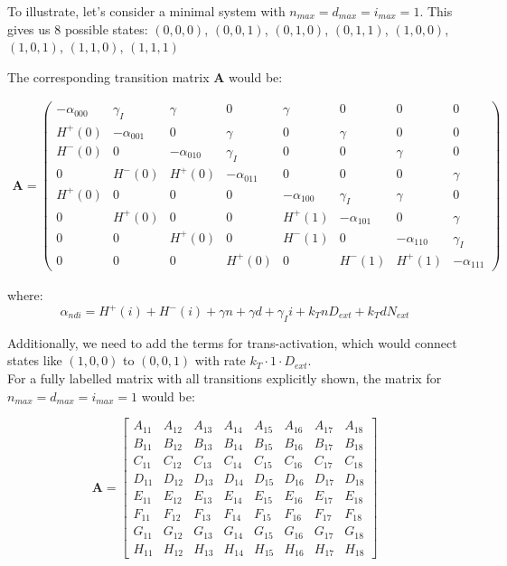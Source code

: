 \documentclass{article}
\begin{document}
\begin{flushleft}
To illustrate, let's consider a minimal system with $n_{max} = d_{max} = i_{max} = 1$. This gives us 8 possible states:
$(0,0,0)$, $(0,0,1)$, $(0,1,0)$, $(0,1,1)$, $(1,0,0)$, $(1,0,1)$, $(1,1,0)$, $(1,1,1)$

The corresponding transition matrix $\mathbf{A}$ would be:

\begin{align*}
\mathbf{A} = 
\begin{pmatrix}
-\alpha_{000} & \gamma_I & \gamma & 0 & \gamma & 0 & 0 & 0 \\
H^+(0) & -\alpha_{001} & 0 & \gamma & 0 & \gamma & 0 & 0 \\
H^-(0) & 0 & -\alpha_{010} & \gamma_I & 0 & 0 & \gamma & 0 \\
0 & H^-(0) & H^+(0) & -\alpha_{011} & 0 & 0 & 0 & \gamma \\
H^+(0) & 0 & 0 & 0 & -\alpha_{100} & \gamma_I & \gamma & 0 \\
0 & H^+(0) & 0 & 0 & H^+(1) & -\alpha_{101} & 0 & \gamma \\
0 & 0 & H^+(0) & 0 & H^-(1) & 0 & -\alpha_{110} & \gamma_I \\
0 & 0 & 0 & H^+(0) & 0 & H^-(1) & H^+(1) & -\alpha_{111}
\end{pmatrix}
\end{align*}

where:
\[
\alpha_{ndi} = H^+(i) + H^-(i) + \gamma n + \gamma d + \gamma_I i + k_T n D_{ext} + k_T d N_{ext}
\]

Additionally, we need to add the terms for trans-activation, which would connect states like $(1,0,0)$ to $(0,0,1)$ with rate $k_T \cdot 1 \cdot D_{ext}$.\\

For a fully labelled matrix with all transitions explicitly shown, the matrix for $n_{max} = d_{max} = i_{max} = 1$ would be:

\[
\mathbf{A} = 
\begin{bmatrix}
A_{11} & A_{12} & A_{13} & A_{14} & A_{15} & A_{16} & A_{17} & A_{18} \\
B_{11} & B_{12} & B_{13} & B_{14} & B_{15} & B_{16} & B_{17} & B_{18} \\
C_{11} & C_{12} & C_{13} & C_{14} & C_{15} & C_{16} & C_{17} & C_{18} \\
D_{11} & D_{12} & D_{13} & D_{14} & D_{15} & D_{16} & D_{17} & D_{18} \\
E_{11} & E_{12} & E_{13} & E_{14} & E_{15} & E_{16} & E_{17} & E_{18} \\
F_{11} & F_{12} & F_{13} & F_{14} & F_{15} & F_{16} & F_{17} & F_{18} \\
G_{11} & G_{12} & G_{13} & G_{14} & G_{15} & G_{16} & G_{17} & G_{18} \\
H_{11} & H_{12} & H_{13} & H_{14} & H_{15} & H_{16} & H_{17} & H_{18}
\end{bmatrix}
\]


\end{flushleft}
\end{document}
